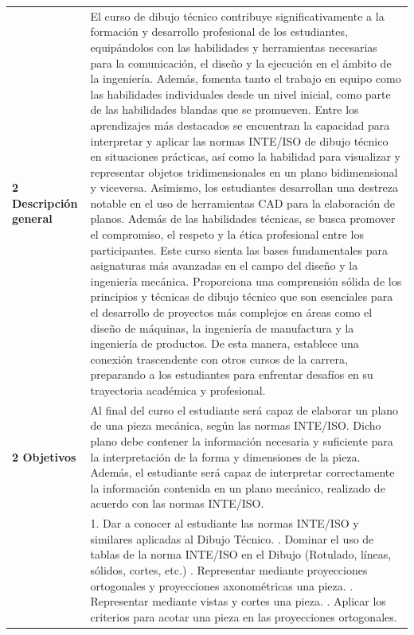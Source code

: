 \documentclass[letterpaper]{article}%
\begin{document}
\newpage%
\renewcommand{\arraystretch}{1.5}%
\begin{longtable}{p{}p{}}%
\par\fontsize{12}{0}\selectfont \textbf{\textcolor{parte}{2 Descripción general}}&El curso de dibujo técnico contribuye significativamente a la formación y desarrollo profesional de los estudiantes, equipándolos con las habilidades y herramientas necesarias para la comunicación, el diseño y la ejecución en el ámbito de la ingeniería. Además, fomenta tanto el trabajo en equipo como las habilidades individuales desde un nivel inicial, como parte de las habilidades blandas que se promueven.\newline%
Entre los aprendizajes más destacados se encuentran la capacidad para interpretar y aplicar las normas INTE/ISO de dibujo técnico en situaciones prácticas, así como la habilidad para visualizar y representar objetos tridimensionales en un plano bidimensional y viceversa. Asimismo, los estudiantes desarrollan una destreza notable en el uso de herramientas CAD para la elaboración de planos. Además de las habilidades técnicas, se busca promover el compromiso, el respeto y la ética profesional entre los participantes.\newline%
Este curso sienta las bases fundamentales para asignaturas más avanzadas en el campo del diseño y la ingeniería mecánica. Proporciona una comprensión sólida de los principios y técnicas de dibujo técnico que son esenciales para el desarrollo de proyectos más complejos en áreas como el diseño de máquinas, la ingeniería de manufactura y la ingeniería de productos. De esta manera, establece una conexión trascendente con otros cursos de la carrera, preparando a los estudiantes para enfrentar desafíos en su trayectoria académica y profesional.\\%
\par\fontsize{12}{0}\selectfont \textbf{\textcolor{parte}{2 Objetivos}}&Al final del curso el estudiante será capaz de elaborar un plano de una pieza mecánica, según las normas INTE/ISO. Dicho plano debe contener la información necesaria y suficiente para la interpretación de la forma y dimensiones de la pieza. Además, el estudiante será capaz de interpretar correctamente la información contenida en un plano mecánico, realizado de acuerdo con las normas INTE/ISO.\\%
&1.	Dar a conocer al estudiante las normas INTE/ISO y similares aplicadas al Dibujo Técnico. \newline%
2.	Dominar el uso de tablas de la norma INTE/ISO en el Dibujo (Rotulado, líneas, sólidos, cortes, etc.) \newline%
3.	Representar mediante proyecciones ortogonales y proyecciones axonométricas una pieza. \newline%
4.	Representar mediante vistas y cortes una pieza. \newline%
 5.	Aplicar los criterios para acotar una pieza en las proyecciones ortogonales. \\%
\end{longtable}%
\end{document}
